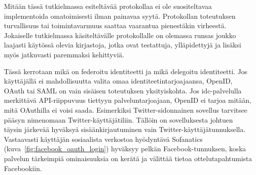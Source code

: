 \documentclass[finnish,gradu]{tktltiki}
\begin{document}








  Mitään tässä tutkielmassa esiteltävää protokollaa ei ole suositeltavaa implementoida omatoimisesti ilman painavaa syytä. Protokollan toteutuksen turvallisuus tai toimintavarmuus saattaa vaarantua pienestäkin virheestä. Jokaiselle tutkielmassa käsiteltävälle protokollalle on olemassa runsas joukko laajasti käytössä olevia kirjastoja, jotka ovat testattuja, ylläpidettyjä ja lisäksi myös jatkuvasti paremmaksi kehittyviä.

  Tässä kerrotaan mikä on federoitu identiteetti ja mikä delegoitu identiteetti.
  Jos käyttäjällä ei mahdollisuutta valita omaa identiteetintarjoajaansa, OpenID, OAuth tai SAML on vain sisäisen toteutuksen yksityiskohta. Jos idc-palvelulla merkittävä API-riippuvuus tiettyyn palveluntarjoajaan, OpenID ei tarjoa mitään, mitä OAuthilla ei voisi saada. Esimerkiksi Twitter-sidonnainen sovellus tarvitsee pääsyn nimenomaan Twitter-käyttäjätiliin. Tällöin on sovelluksesta johtuen täysin järkevää hyväksyä sisäänkirjautuminen vain Twitter-käyttäjätunnuksella. Vastaavasti käyttäjän sosiaalista verkostoa hyödyntävä Sofanatics (kuva~\ref{fig:facebook_oauth_login}) hyväksyy pelkän Facebook-tunnuksen, koska palvelun tärkeimpiä ominaisuuksia on kerätä ja välittää tietoa ottelutapahtumista Facebookiin.
\end{document}
